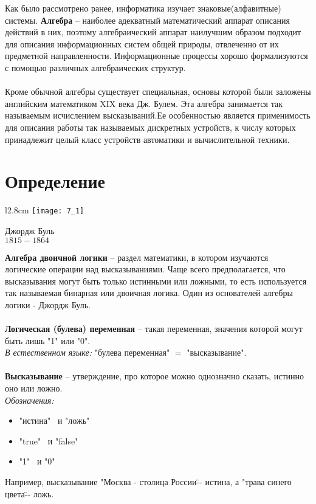 Как было рассмотрено ранее, информатика изучает знаковые(алфавитные) системы. \textbf{Алгебра} -- наиболее адекватный математический аппарат описания действий в них, поэтому алгебраический аппарат наилучшим образом подходит для описания информационных систем общей природы, отвлеченно от их предметной направленности. Информационные процессы хорошо формализуются с помощью различных алгебраических структур. \\
\\Кроме обычной алгебры существует специальная, основы которой были заложены английским математиком XIX века Дж. Булем. Эта алгебра занимается так называемым исчислением высказываний.Ее особенностью является применимость для описания работы так называемых дискретных устройств, к числу которых принадлежит целый класс устройств автоматики и вычислительной техники.
\section{Определение}
\begin{wrapfigure}[13]{l}{2.8cm}
\texttt{[image: 7\_1]}
\begin{center}
\footnotesize{Джордж Буль}
\\\footnotesize{$1815 - 1864$}
\end{center}
\end{wrapfigure}
\textbf{Алгебра двоичной логики} -- раздел математики, в котором изучаются логические операции над высказываниями. Чаще всего предполагается, что высказывания могут быть только истинными или ложными, то есть используется так называемая бинарная или двоичная логика. Один из основателей алгебры логики - Джордж Буль.
\\
\\\textbf{Логическая (булева) переменная} – такая переменная, значения которой могут быть лишь "1" или "0".
\\\emph{В естественном языке:} "булева переменная" $=$ "высказывание".
\\
\textbf{\\Высказывание} -- утверждение, про которое можно однозначно сказать, истинно оно или ложно.
\\\emph{Обозначения:}
\begin{itemize}
  \item "истина" \ и "ложь"
  \item "true" \ и "false"
  \item "1" \ и "0"
\end{itemize}
Например, высказывание "Москва - столица России\"  -- истина, а "трава синего цвета\"  -- ложь.
